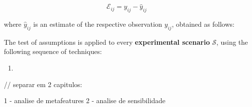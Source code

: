 $$\mathcal{E}_{ij} = y_{ij} - \hat{y}_{ij}$$

where $\hat{y}_{ij}$ is an estimate of the respective observation $y_{ij}$, obtained as follows:

    


The test of assumptions is applied to every \textbf{experimental scenario} $\mathcal{S}$, using the following sequence of techniques:

\begin{enumerate}
    \item 
\end{enumerate}

// separar em 2 capitulos:

1 - analise de metafeatures
2 - analise de sensibilidade




